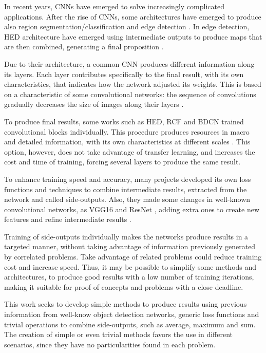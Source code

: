 In recent years, CNNs have emerged to solve increasingly complicated applications.
After the rise of CNNs, some architectures have emerged to produce also region segmentation/classification and edge detection \cite[Ch. 1]{Goodfellow2016} \cite{Segnet:2017:7803544}.
In edge detection, HED architecture have emerged using intermediate outputs to produce maps that are then combined, generating a final proposition \cite{HED:2015}.

Due to their architecture, a common CNN produces different information along its layers.
Each layer contributes specifically to the final result, with its own characteristics, that indicates how the network adjusted its weights.
This is based on a characteristic of some convolutional networks: the sequence of convolutions gradually decreases the size of images along their layers \cite{VGGNET:2014} \cite{Zeiler:2014} \cite{Fidler:2007} \cite{Hadji:2018}.

To produce final results, some works such as HED, RCF and BDCN trained convolutional blocks individually. 
This procedure produces resources in macro and detailed information, with its own characteristics at different scales \cite{HED:2015} \cite{RCF:2019} \cite{He:2019}. 
This option, however, does not take advantage of transfer learning, and increases the cost and time of training, forcing several layers to produce the same result.

To enhance training speed and accuracy, many projects developed its own loss functions and techniques to combine intermediate results, extracted from the network and called side-outputs.
Also, they made some changes in well-known convolutional networks, as VGG16 \cite{VGGNET:2014} and ResNet \cite{RESNET:2016:7780459}, adding extra ones to create new features and refine intermediate results \cite{DeepStructured:2017:Xu20173962} \cite{COB:2016} \cite{ProeminentEdge:2018:Cai2018}.

Training of side-outputs individually makes the networks produce results in a targeted manner, without taking advantage of information previously generated by correlated problems.
Take advantage of related problems could reduce training cost and increase speed.
Thus, it may be possible to simplify some methods and architectures, to produce good results with a low number of training iterations, making it suitable for proof of concepts and problems with a close deadline.

This work seeks to develop simple methods to produce results using previous information from well-know object detection networks, generic
loss functions and trivial operations to combine side-outputs, such as average, maximum and sum.
The creation of simple or even trivial methods favors the use in different scenarios, since they have no particularities found in each problem.
